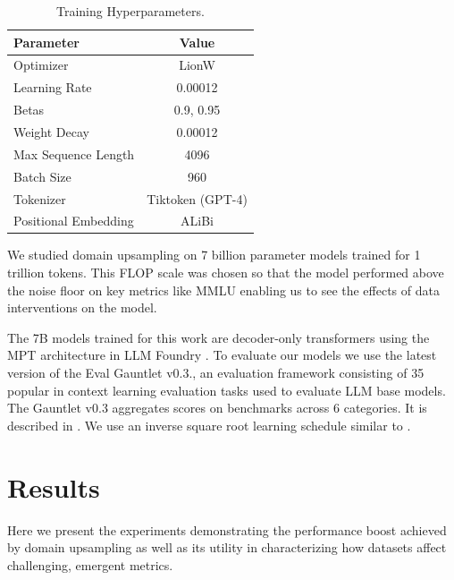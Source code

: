 \documentclass[10pt]{article} %
\begin{document}
\begin{table}
    \small
    \centering
    \begin{tabular}{l c} \toprule 
         \textbf{Parameter} & \textbf{Value}  \\
         \midrule
         Optimizer & LionW \citep{chen2024symbolic} \\
         Learning Rate & 0.00012 \\
         Betas & 0.9, 0.95 \\
         Weight Decay & 0.00012 \\
         Max Sequence Length & 4096 \\
         Batch Size & 960 \\
         Tokenizer & Tiktoken (GPT-4) \\
         Positional Embedding & ALiBi \citep{press2022train} \\
         \bottomrule
    \end{tabular}
    \caption{Training Hyperparameters.}
    \label{tab:architecture}
\end{table}

We studied domain upsampling on 7 billion parameter models trained for 1 trillion tokens.  This FLOP scale was chosen so that the model performed above the noise floor on key metrics like MMLU enabling us to see the effects of data interventions on the model. 

The 7B models trained for this work are decoder-only transformers using the MPT architecture in LLM Foundry \citep{mosaicml2023mpt}. To evaluate our models we use the latest version of the Eval Gauntlet v0.3.\citep{mosaicml2023mpt}, an evaluation framework consisting of 35 popular in context learning evaluation tasks used to evaluate LLM base models. The Gauntlet v0.3 aggregates scores on benchmarks across 6 categories. It is described in . We use an inverse square root learning schedule similar to \citep{zhai2022scaling}.  



\section{Results}
Here we present the experiments demonstrating the performance boost achieved by domain upsampling as well as its utility in characterizing how datasets affect challenging, emergent metrics.
\end{document}
